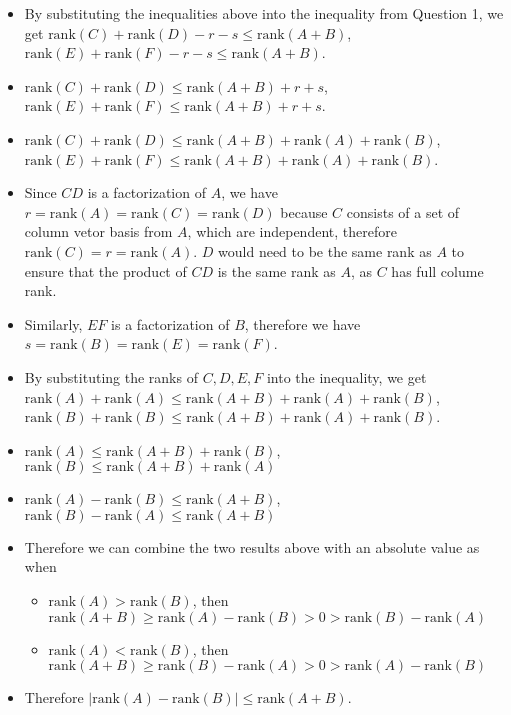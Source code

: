 \documentclass[10pt]{article}
\begin{document}
{{\begin{enumerate}
\begin{itemize}
\begin{itemize}
				\item Since \( \text{col}(E) \subseteq \text{col}(X) \), then \( \text{rank}(E) \leq \text{rank}(X) \).
				\item Since \( \text{row}(D) \subseteq \text{row}(Y) \), then \( \text{rank}(D) \leq \text{rank}(Y) \).
				\item Since \( \text{row}(F) \subseteq \text{row}(Y) \), then \( \text{rank}(F) \leq \text{rank}(Y) \).
			\end{itemize}
			\item By substituting the inequalities above into the inequality from Question 1, we get \( \text{rank}(C) + \text{rank}(D) - r - s \leq \text{rank}(A+B) \), \(\text{rank}(E) + \text{rank}(F) - r - s \leq \text{rank}(A+B)\).
			\item \(\text{rank}(C) + \text{rank}(D) \leq \text{rank}(A + B) + r + s\), \(\text{rank}(E) + \text{rank}(F) \leq \text{rank}(A + B) + r + s\).
			\item \(\text{rank}(C) + \text{rank}(D) \leq \text{rank}(A + B) + \text{rank}(A) + \text{rank}(B)\), \(\text{rank}(E) + \text{rank}(F) \leq \text{rank}(A + B) + \text{rank}(A) + \text{rank}(B)\).
			\item Since \(CD\) is a factorization of \(A\), we have \(r = \text{rank}(A) = \text{rank}(C) = \text{rank}(D)\) because $C$ consists of a set of column vetor basis from $A$, which are independent, therefore \(\text{rank}(C) = r = \text{rank}(A)\). $D$ would need to be the same rank as $A$ to ensure that the product of $CD$ is the same rank as $A$, as $C$ has full colume rank.
			\item Similarly, \(EF\) is a factorization of \(B\), therefore we have \(s = \text{rank}(B) = \text{rank}(E) = \text{rank}(F)\).
			\item By substituting the ranks of \(C, D, E, F\) into the inequality, we get \(\text{rank}(A) + \text{rank}(A) \leq \text{rank}(A + B) + \text{rank}(A) + \text{rank}(B)\), \(\text{rank}(B) + \text{rank}(B) \leq \text{rank}(A + B) + \text{rank}(A) + \text{rank}(B)\).
			\item \(\text{rank}(A) \leq \text{rank}(A + B) + \text{rank}(B)\), \(\text{rank}(B) \leq \text{rank}(A + B) + \text{rank}(A)\)
			\item \(\text{rank}(A) - \text{rank}(B) \leq \text{rank}(A + B)\), \(\text{rank}(B) - \text{rank}(A) \leq \text{rank}(A + B)\)
			\item Therefore we can combine the two results above with an absolute value as when 
			\begin{itemize}
				\item \(\text{rank}(A) > \text{rank}(B)\), then \(\text{rank}(A + B) \geq \text{rank}(A) - \text{rank}(B) > 0 > \text{rank}(B) - \text{rank}(A)\)
				\item \(\text{rank}(A) < \text{rank}(B)\), then \(\text{rank}(A + B) \geq \text{rank}(B) - \text{rank}(A) > 0 > \text{rank}(A) - \text{rank}(B)\)
			\end{itemize}
			\item Therefore \(| \text{rank}(A) - \text{rank}(B) | \leq \text{rank}(A + B)\).
		\end{itemize}
	\end{enumerate}

	}
}
\end{document}
